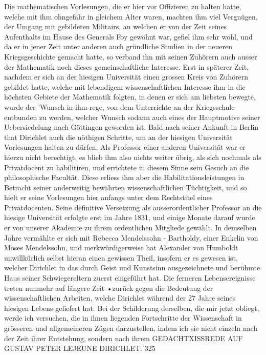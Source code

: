 \documentclass[11pt]{article}
\begin{document}
\noindent Die mathematischen Vorlesungen, die er hier vor Offizieren zu halten hatte, welche mit ihm ohngefähr in gleichem Alter waren, machten ihm viel Vergnügen, der Umgang mit gebildeten Militairs, an welchen er von der Zeit seines Aufenthalts im Hause des Generals Foy gewöhnt war, gefiel ihm sehr wohl, und da er in jener Zeit unter anderen auch gründliche Studien in der neueren Kriegsgeschichte gemacht hatte, so verband ihn mit seinen Zuhörern auch ausser der Mathematik noch dieses gemeinschaftliche Interesse. Erst in späterer Zeit, nachdem er sich an der hiesigen Universität einen grossen Kreis von Zuhörern gebildet hatte, welche mit lebendigem wissenschaftlichen Interesse ihm in die höchsten Gebiete der Mathematik folgten, in denen er sich am liebsten bewegte, wurde der 'Wunsch in ihm rege, von dem Unterrichte an der Kriegsschule entbunden zu werden, welcher Wunsch sodann auch eines der Hauptmotive seiner Uebersiedelung nach Göttingen geworden ist. Bald nach seiner Ankunft in Berlin that Dirichlet auch die nöthigen Schritte, um an der hiesigen Universität Vorlesungen halten zu dürfen. Als Professor einer anderen Universität war er hierzu nicht berechtigt, es blieb ihm also nichts weiter übrig, als sich nochmals als Privatdocent zu habilitiren, und errichtete in diesem Sinne sein Gesuch an die philosophische Facultät. Diese erliess ihm aber die Habilitationsleistungen in Betracht seiner anderweitig bewährten wissenschaftlichen Tüchtigkeit, und so hielt er seine Vorlesungen hier anfangs unter dem Rechtstitel eines Privatdocenten. Seine definitive Versetzung als ausserordentlicher Professor an die hiesige Universität erfolgte erst im Jahre 1831, und einige Monate darauf wurde er von unserer Akademie zu ihrem ordentlichen Mitgliede gewählt. In demselben Jahre vermählte er sich mit Rebecca Mendelssohn - Bartholdy, einer Enkelin von Moses Mendelssohn, und merkwürdigerweise hat Alexander von Humboldt unwillkürlich selbst hieran einen gewissen Theil, insofern er es gewesen ist, welcher Dirichlet in das durch Geist und Kunstsinn ausgezeichnete und berühmte Haus seiner Schwiegereltern zuerst eingeführt hat. Die ferneren Lebensereignisse treten nunmehr auf längere Zeit •zurück gegen die Bedeutung der wissenschaftlichen Arbeiten, welche Dirichlet während der 27 Jahre seines hiesigen Lebens geliefert hat. Bei der Schilderung derselben, die mir jetzt obliegt, werde ich versuchen, die in ihnen liegenden Fortschritte der Wissenschaft in grösseren und allgemeineren Zügen darzustellen, indem ich sie nicht einzeln nach der Zeit ihrer Entstehung, sondern nach ihrem GEDACHTXISSREDE AUF GUSTAV PETER LEJEUNE DIRICHLET. 325
\par
\end{document}

